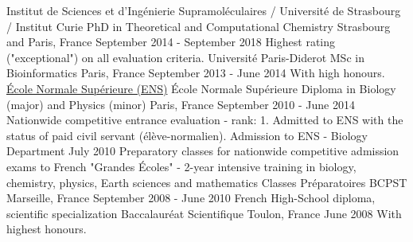 
\begin{cventries}
  \cventry
    {Institut de Sciences et d'Ingénierie Supramoléculaires / Université de Strasbourg / Institut Curie}
    {PhD in Theoretical and Computational Chemistry}
    {Strasbourg and Paris, France}
    {September 2014 - September 2018}
    {Highest rating ("exceptional") on all evaluation criteria.}
    \vspace{\cvvertspace}
 \cventry
    {Université Paris-Diderot}
    {MSc in Bioinformatics}
    {Paris, France}
    {September 2013 - June 2014}
    {With high honours.}
    \vspace{\cvvertspace}
 \cventry
    {\href{https://www.ens.fr/en}{École Normale Supérieure (ENS)}}
    {École Normale Supérieure Diploma in Biology (major) and Physics (minor)}
 	{Paris, France}
 	{September 2010 - June 2014}
 	{}
 	\vspace{\cvvertspace}
 \cventry
    {Nationwide competitive entrance evaluation - rank: 1. Admitted to ENS with the status of paid civil servant (élève-normalien).}
    {Admission to ENS - Biology Department}
    {}
    {July 2010}
    {}
    \vspace{\cvvertspace}
 \cventry
    {Preparatory classes for nationwide competitive admission exams to French "Grandes Écoles" - 2-year intensive training in biology, chemistry, physics, Earth sciences and mathematics}
    {Classes Préparatoires BCPST}
    {Marseille, France}
    {September 2008 - June 2010}
    {}
    \vspace{\cvvertspace}
  \cventry
    {French High-School diploma, scientific specialization}
    {Baccalauréat Scientifique}
    {Toulon, France}
    {June 2008}
    {With highest honours.}
    {}
\end{cventries}
